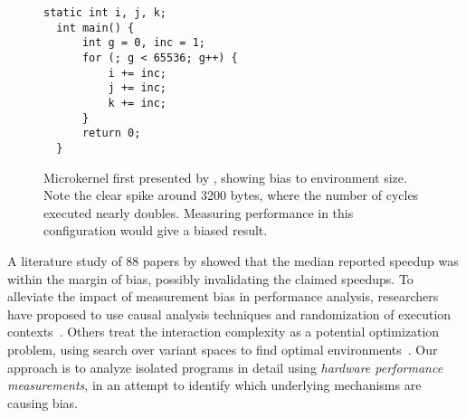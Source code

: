\documentclass[prodmode,acmtaco]{acmsmall}
\begin{document}
\begin{figure}[t]
\begin{minipage}[t]{0.40\textwidth}
  \vspace{3mm}
  \begin{lstlisting}[frame=tb]
  static int i, j, k;
  int main() {
      int g = 0, inc = 1;
      for (; g < 65536; g++) {
          i += inc;
          j += inc;
          k += inc;
      }
      return 0;
  }
  \end{lstlisting}
\end{minipage}
\begin{minipage}[t]{0.55\textwidth}
  \begin{flushleft}
  \end{flushleft}
\end{minipage}
\label{fig:motivation}
\caption{Microkernel first presented by , showing bias to environment size. Note the clear spike around 3200 bytes, where the number of cycles executed nearly doubles. Measuring performance in this configuration would give a biased result.}
\end{figure}

A literature study of 88 papers by  showed that the median reported speedup was within the margin of bias, possibly invalidating the claimed speedups. 
To alleviate the impact of measurement bias in performance analysis, researchers have proposed to use causal analysis techniques and randomization of execution contexts~\cite{Mytkowicz:2008:OE&MB}.
Others treat the interaction complexity as a potential optimization problem, using search over variant spaces to find optimal environments~\cite{Knights:2009:BlindOpt}.
Our approach is to analyze isolated programs in detail using \emph{hardware performance measurements}, in an attempt to identify which underlying mechanisms are causing bias.
\end{document}
